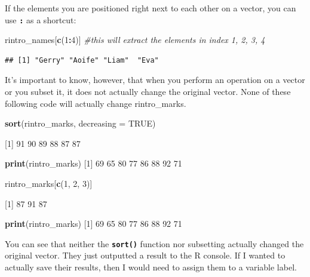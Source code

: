 \documentclass[
]{book}
\newenvironment{Shaded}{\begin{snugshade}}{\end{snugshade}}
\newcommand{\AttributeTok}[1]{\textcolor[rgb]{0.13,0.29,0.53}{#1}}
\newcommand{\CommentTok}[1]{\textcolor[rgb]{0.56,0.35,0.01}{\textit{#1}}}
\newcommand{\ConstantTok}[1]{\textcolor[rgb]{0.56,0.35,0.01}{#1}}
\newcommand{\DecValTok}[1]{\textcolor[rgb]{0.00,0.00,0.81}{#1}}
\newcommand{\FunctionTok}[1]{\textcolor[rgb]{0.13,0.29,0.53}{\textbf{#1}}}
\newcommand{\NormalTok}[1]{#1}
\newcommand{\SpecialCharTok}[1]{\textcolor[rgb]{0.81,0.36,0.00}{\textbf{#1}}}
\begin{document}
If the elements you are positioned right next to each other on a vector, you can use \textbf{\texttt{:}} as a shortcut:

\begin{Shaded}
\begin{Highlighting}[]
\NormalTok{rintro\_names[}\FunctionTok{c}\NormalTok{(}\DecValTok{1}\SpecialCharTok{:}\DecValTok{4}\NormalTok{)] }\CommentTok{\#this will extract the elements in index 1, 2, 3, 4}
\end{Highlighting}
\end{Shaded}

\begin{verbatim}
## [1] "Gerry" "Aoife" "Liam"  "Eva"
\end{verbatim}

It's important to know, however, that when you perform an operation on a vector or you subset it, it does not actually change the original vector. None of these following code will actually change rintro\_marks.

\begin{Shaded}
\begin{Highlighting}[]
\FunctionTok{sort}\NormalTok{(rintro\_marks, }\AttributeTok{decreasing =} \ConstantTok{TRUE}\NormalTok{)}

\NormalTok{[}\DecValTok{1}\NormalTok{] }\DecValTok{91} \DecValTok{90} \DecValTok{89} \DecValTok{88} \DecValTok{87} \DecValTok{87}

\FunctionTok{print}\NormalTok{(rintro\_marks)}
\NormalTok{[}\DecValTok{1}\NormalTok{] }\DecValTok{69} \DecValTok{65} \DecValTok{80} \DecValTok{77} \DecValTok{86} \DecValTok{88} \DecValTok{92} \DecValTok{71}

\NormalTok{rintro\_marks[}\FunctionTok{c}\NormalTok{(}\DecValTok{1}\NormalTok{, }\DecValTok{2}\NormalTok{, }\DecValTok{3}\NormalTok{)]}

\NormalTok{[}\DecValTok{1}\NormalTok{] }\DecValTok{87} \DecValTok{91} \DecValTok{87}

\FunctionTok{print}\NormalTok{(rintro\_marks)}
\NormalTok{[}\DecValTok{1}\NormalTok{] }\DecValTok{69} \DecValTok{65} \DecValTok{80} \DecValTok{77} \DecValTok{86} \DecValTok{88} \DecValTok{92} \DecValTok{71}
\end{Highlighting}
\end{Shaded}

You can see that neither the \textbf{\texttt{sort()}} function nor subsetting actually changed the original vector. They just outputted a result to the R console. If I wanted to actually save their results, then I would need to assign them to a variable label.
\end{document}
